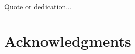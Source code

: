 % 
% 
% 
% 
%








   \frontmatter

   \pagestyle{prelim}
   
   
   \newpage
	
	
	 \thispagestyle{plain}
	 \vspace*{20em}
	 \begin{center}
	   Quote or dedication...
	 \end{center}
	 \newpage
   
   \doublespacing
   
   \tableofcontents
   \newpage
   
   
   \newpage
   
   \section*{Acknowledgments}
   
   
   \mainmatter
   
